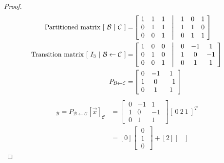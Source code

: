 \documentclass[../main.tex]{subfiles}
\begin{document}
\begin{proof}
        \begin{align*}
                \textrm{Partitioned matrix } [\ \mathcal{B}\ |\ \mathcal{C}\ ] =
                 & \begin{bmatrix}
                        \ 1 & 1 & 1 & \bigm| & 1 & 0 & 1 \ \\
                        \ 0 & 1 & 1 & \bigm| & 1 & 1 & 0 \ \\
                        \ 0 & 0 & 1 & \bigm| & 0 & 1 & 1 \
                \end{bmatrix} \\
                \textrm{Transition matrix } [\ I_3 \ |\ {\mathcal{B} \leftarrow \mathcal{C}}\ ] =
                 & \begin{bmatrix}
                        \ 1 & 0 & 0 & \bigm| & 0 & -1 & 1 \  \\
                        \ 0 & 1 & 0 & \bigm| & 1 & 0  & -1 \ \\
                        \ 0 & 0 & 1 & \bigm| & 0 & 1  & 1 \
                \end{bmatrix} \\
                P_{\mathcal{B} \leftarrow \mathcal{C}} =
                 & \begin{bmatrix}
                        \ 0 & -1 & 1 \  \\
                        \ 1 & 0  & -1 \ \\
                        \ 0 & 1  & 1  \
                \end{bmatrix}
        \end{align*}
        \begin{align*}
                [\vec{x}]_\mathcal{B} = P_{\mathcal{B} \leftarrow \mathcal{C}}[\vec{x}]_{\mathcal{C}}
                 & = \begin{bmatrix}
                        \ 0 & -1 & 1 \  \\
                        \ 1 & 0  & -1 \ \\
                        \ 0 & 1  & 1  \
                \end{bmatrix}[\ 0 \ 2 \ 1\ ]^T \\
                 & = [0]\begin{bmatrix}
                        \ 0 \ \\
                        \ 1 \ \\
                        \ 0 \
                \end{bmatrix} +
                [2] \begin{bmatrix}

\end{bmatrix}
\end{align*}
\end{proof}
\end{document}
